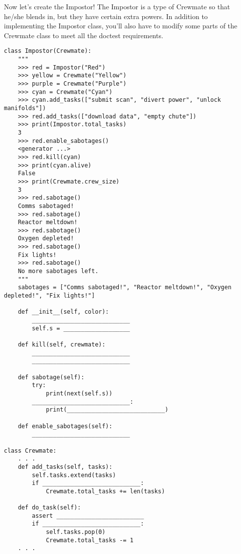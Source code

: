 \question Now let's create the Impostor! The Impostor is a type of Crewmate so that he/she blends in, but they have certain extra powers. In addition to implementing the Impostor class, you'll also have to modify some parts of the Crewmate class to meet all the doctest requirements.
\begin{lstlisting}
class Impostor(Crewmate):
    """
    >>> red = Impostor("Red")
    >>> yellow = Crewmate("Yellow")
    >>> purple = Crewmate("Purple")
    >>> cyan = Crewmate("Cyan")
    >>> cyan.add_tasks(["submit scan", "divert power", "unlock manifolds"])
    >>> red.add_tasks(["download data", "empty chute"])
    >>> print(Impostor.total_tasks)
    3
    >>> red.enable_sabotages()
    <generator ...>
    >>> red.kill(cyan)
    >>> print(cyan.alive)
    False
    >>> print(Crewmate.crew_size)
    3
    >>> red.sabotage()
    Comms sabotaged!
    >>> red.sabotage()
    Reactor meltdown!
    >>> red.sabotage()
    Oxygen depleted!
    >>> red.sabotage()
    Fix lights!
    >>> red.sabotage()
    No more sabotages left.
    """
    sabotages = ["Comms sabotaged!", "Reactor meltdown!", "Oxygen depleted!", "Fix lights!"]
    
    def __init__(self, color):
        ____________________________
        self.s = ___________________
    
    def kill(self, crewmate):
        ____________________________
        ____________________________
    
    def sabotage(self):
        try:
            print(next(self.s))
        ____________________________:
            print(____________________________)
    
    def enable_sabotages(self):
    	____________________________

class Crewmate:
    . . .
    def add_tasks(self, tasks):
        self.tasks.extend(tasks)
        if ____________________________:
            Crewmate.total_tasks += len(tasks)
    
    def do_task(self):
        assert _________________________
        if ____________________________:
            self.tasks.pop(0)
            Crewmate.total_tasks -= 1
    . . .
\end{lstlisting}

